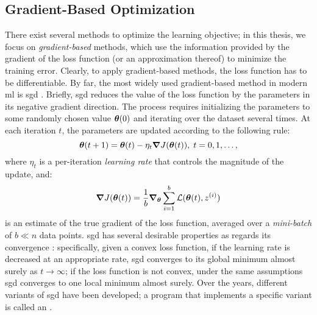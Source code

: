 \subsection{Gradient-Based Optimization}
There exist several methods to optimize the learning objective; in this thesis, we focus on \emph{gradient-based} methods, which use the information provided by the gradient of the loss function (or an approximation thereof) to minimize the training error. Clearly, to apply gradient-based methods, the loss function has to be differentiable. By far, the most widely used gradient-based method in modern \gls{ml} is \gls{sgd} \citep{ruder2016overviewsgd}. Briefly, \gls{sgd} reduces the value of the loss function by  the parameters in its negative gradient direction. The process requires initializing the parameters to some randomly chosen value $\boldsymbol{\theta}(0)$ and iterating over the dataset several times. At each iteration $t$, the parameters are updated according to the following rule:
$$ \boldsymbol{\theta}(t+1) = \boldsymbol{\theta}(t) - \eta_t \grad J(\boldsymbol{\theta}(t)),\; t= 0, 1, \ldots,$$
where $\eta_t$ is a per-iteration \emph{learning rate} that controls the magnitude of the update, and:
$$ \grad J(\boldsymbol{\theta}(t)) = \frac{1}{b} \grad_{\boldsymbol{\theta}}  \sum_{i=1}^{b} \mathcal{L}(\boldsymbol{\theta}(t), z^{(i)})$$
is an estimate of the true gradient of the loss function, averaged over a \emph{mini-batch} of $b \ll n$ data points. \gls{sgd} has several desirable properties as regards its convergence \citep{robbins1951stochastic}: specifically, given a convex loss function, if the learning rate is decreased at an appropriate rate, \gls{sgd} converges to its global minimum almost surely as $t \to \infty$; if the loss function is not convex, under the same assumptions \gls{sgd} converges to one local minimum almost surely. Over the years, different variants of \gls{sgd} have been developed; a program that implements a specific variant is called an .

